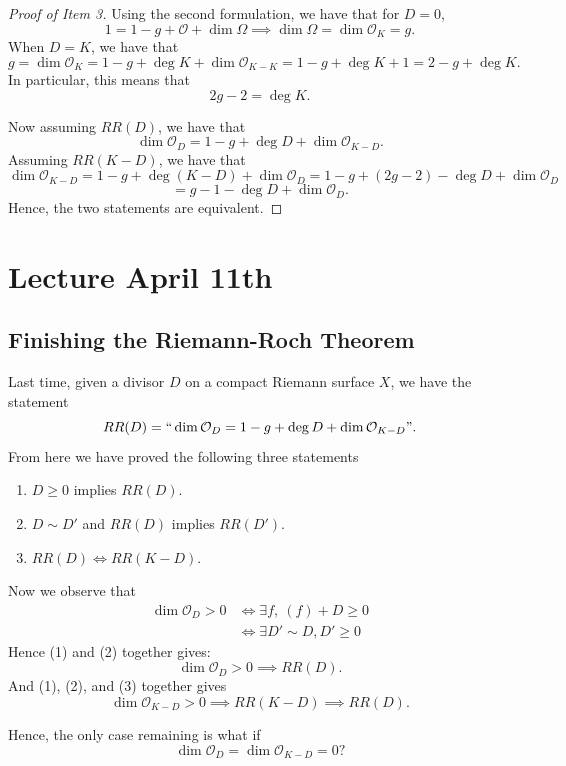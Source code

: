 \documentclass{article}
\begin{document}
{\begin{proof}[Proof of Item 3]
    Using the second formulation, we have that for $D = 0$,
    \[1 = 1 - g + \mathcal{O} + \dim \Omega \implies \dim \Omega = \dim \mathcal{O}_K = g.\]
    When $D = K$, we have that
    \[g = \dim \mathcal{O}_K = 1 - g + \deg K + \dim \mathcal{O}_{K-K} = 1 - g + \deg K + 1 = 2 - g + \deg K.\]
    In particular, this means that
    \[2g - 2 = \deg K.\]

    Now assuming $RR(D)$, we have that
    \[\dim \mathcal{O}_D = 1 - g + \deg D + \dim \mathcal{O}_{K-D}.\]
    Assuming $RR(K-D)$, we have that
    \[\dim \mathcal{O}_{K-D} = 1 - g + \deg(K-D) + \dim \mathcal{O}_D = 1 - g + (2g - 2) - \deg D + \dim \mathcal{O}_D\]
    \[= g - 1 - \deg D + \dim \mathcal{O}_D.\]
    Hence, the two statements are equivalent.
\end{proof}

\newpage
\section{Lecture April 11th}

\subsection{Finishing the Riemann-Roch Theorem}

Last time, given a divisor $D$ on a compact Riemann surface $X$, we have the statement
\[RR(D) = ``\dim \mathcal{O}_D = 1 - g + \deg D + \dim \mathcal{O}_{K-D}".\]
From here we have proved the following three statements
\begin{enumerate}
    \item $D \geq 0$ implies $RR(D)$.
    \item $D \sim D'$ and $RR(D)$ implies $RR(D')$.
    \item $RR(D) \iff RR(K-D)$.
\end{enumerate}

Now we observe that
\begin{align*}
    \dim \mathcal{O}_D > 0 &\iff \exists f,\ (f) + D \geq 0\\
    &\iff \exists D' \sim D, D' \geq 0 \tag*{Here $\sim$ means linear equivalence}
\end{align*}
Hence (1) and (2) together gives:
\[\dim \mathcal{O}_D > 0 \implies RR(D).\]
And (1), (2), and (3) together gives
\[\dim \mathcal{O}_{K-D} > 0 \implies RR(K-D) \implies RR(D). \]

Hence, the only case remaining is what if
\[\dim \mathcal{O}_D = \dim \mathcal{O}_{K-D} = 0?\]

}
\end{document}
